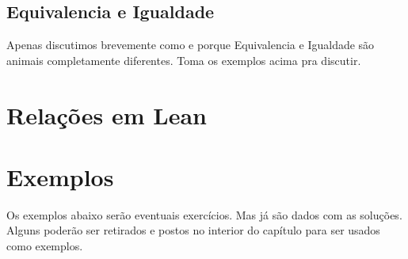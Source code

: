\subsection{Equivalencia e Igualdade}
Apenas discutimos brevemente como e porque Equivalencia e Igualdade são animais completamente diferentes. Toma os exemplos acima pra discutir.

\section{Relações em Lean}

\section{Exemplos}
Os exemplos abaixo serão eventuais exercícios.
Mas já são dados com as soluções. Alguns poderão ser retirados e postos no interior do capítulo para ser usados como exemplos.

